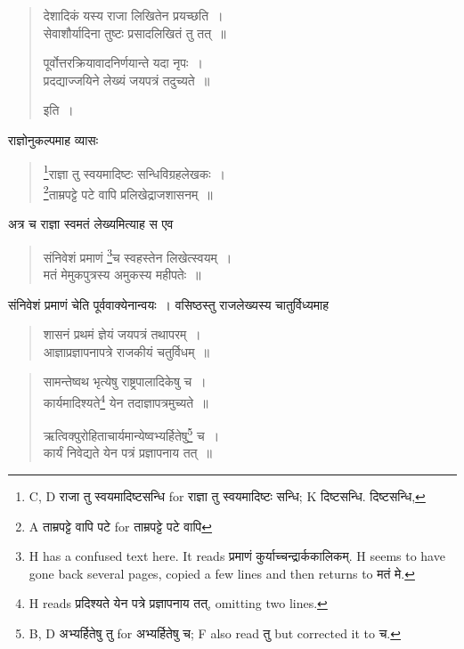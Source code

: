 \documentclass[11pt, openany]{book}
\begin{document}
\begin{quote}
{\vy देशादिकं यस्य राजा लिखितेन प्रयच्छति~।\\
सेवाशौर्यादिना तुष्टः प्रसादलिखितं तु तत्~॥

पूर्वोत्तरक्रियावादनिर्णयान्ते यदा नृपः~।\\
प्रदद्याज्जयिने लेख्यं जयपत्रं तदुच्यते~॥} इति~।
\end{quote}

राज्ञोनुकल्पमाह व्यासः 

\begin{quote}
{\vy \renewcommand{\thefootnote}{5}\footnote{C, D राजा तु स्वयमादिष्टसन्धि for राज्ञा तु स्वयमादिष्टः सन्धि; K दिष्टसन्धि. दिष्टसन्धि,}राज्ञा तु स्वयमादिष्टः सन्धिविग्रहलेखकः~।\\
\renewcommand{\thefootnote}{6}\footnote{A ताम्रपट्टे वापि पटे for ताम्रपट्टे पटे वापि}ताम्रपट्टे पटे वापि प्रलिखेद्राजशासनम्~॥}
\end{quote}

अत्र च राज्ञा स्वमतं लेख्यमित्याह स एव

\begin{quote}
{\vy संनिवेशं प्रमाणं \renewcommand{\thefootnote}{7}\footnote{H has a confused text here. It reads प्रमाणं कुर्याच्चन्द्रार्ककालिकम्. H seems to have gone back several pages, copied a few lines and then returns to मतं मे.}च स्वहस्तेन लिखेत्स्वयम्~।\\
मतं मेमुकपुत्रस्य अमुकस्य महीपतेः~॥}
\end{quote}

संनिवेशं प्रमाणं चेति पूर्ववाक्येनान्वयः~। वसिष्ठस्तु राजलेख्यस्य चातुर्विध्यमाह

\begin{quote}
{\vy शासनं प्रथमं ज्ञेयं जयपत्रं तथापरम्~।\\
आज्ञाप्रज्ञापनापत्रे राजकीयं चतुर्विधम्~॥}
\end{quote}

\newpage
{}

\begin{quote}
{\vy सामन्तेष्वथ भृत्येषु राष्ट्रपालादिकेषु च~।\\
कार्यमादिश्यते\renewcommand{\thefootnote}{1}\footnote{H reads प्रदिश्यते येन पत्रे प्रज्ञापनाय तत्, omitting two lines.} येन तदाज्ञापत्रमुच्यते~॥

ऋत्विक्पुरोहिताचार्यमान्येष्वभ्यर्हितेषु\renewcommand{\thefootnote}{2}\footnote{B, D अभ्यर्हितेषु तु for अभ्यर्हितेषु च; F also read तु but corrected it to च.} च~।\\
कार्यं निवेद्यते येन पत्रं प्रज्ञापनाय तत्~॥}
\end{quote}
\end{document}
